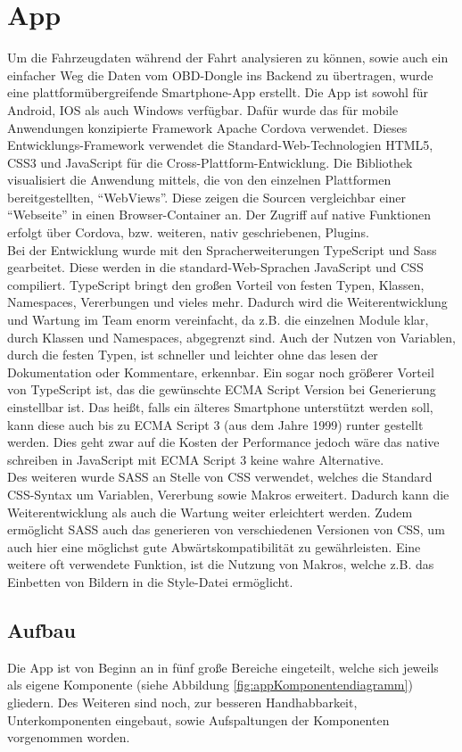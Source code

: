 \section{App}
Um die Fahrzeugdaten während der Fahrt analysieren zu können, sowie auch ein einfacher Weg die Daten vom OBD-Dongle ins Backend zu übertragen, wurde eine plattformübergreifende Smartphone-App erstellt. Die App ist sowohl für Android, IOS als auch Windows verfügbar. Dafür wurde das für mobile Anwendungen konzipierte Framework Apache Cordova verwendet. Dieses Entwicklungs-Framework verwendet die Standard-Web-Technologien HTML5, CSS3 und JavaScript für die Cross-Plattform-Entwicklung. Die Bibliothek visualisiert die Anwendung mittels, die von den einzelnen Plattformen bereitgestellten, \enquote{WebViews}. Diese zeigen die Sourcen vergleichbar einer \enquote{Webseite} in einen Browser-Container an. Der Zugriff auf native Funktionen erfolgt über Cordova, bzw. weiteren, nativ geschriebenen, Plugins.
\\
Bei der Entwicklung wurde mit den Spracherweiterungen TypeScript und Sass gearbeitet. Diese werden in die standard-Web-Sprachen JavaScript und CSS compiliert. TypeScript bringt den großen Vorteil von festen Typen, Klassen, Namespaces, Vererbungen und vieles mehr. Dadurch wird die Weiterentwicklung und Wartung im Team enorm vereinfacht, da z.B. die einzelnen Module klar, durch Klassen und Namespaces, abgegrenzt sind. Auch der Nutzen von Variablen, durch die festen Typen, ist schneller und leichter ohne das lesen der Dokumentation oder Kommentare, erkennbar. Ein sogar noch größerer Vorteil von TypeScript ist, das die gewünschte ECMA Script Version bei Generierung einstellbar ist. Das heißt, falls ein älteres Smartphone unterstützt werden soll, kann diese auch bis zu ECMA Script 3 (aus dem Jahre 1999) runter gestellt werden. Dies geht zwar auf die Kosten der Performance jedoch wäre das native schreiben in JavaScript mit ECMA Script 3 keine wahre Alternative. 
\\
Des weiteren wurde SASS an Stelle von CSS verwendet, welches die Standard CSS-Syntax um Variablen, Vererbung sowie Makros erweitert. Dadurch kann die Weiterentwicklung als auch die Wartung weiter erleichtert werden. Zudem ermöglicht SASS auch das generieren von verschiedenen Versionen von CSS, um auch hier eine möglichst gute Abwärtskompatibilität zu gewährleisten. Eine weitere oft verwendete Funktion, ist die Nutzung von Makros, welche z.B. das Einbetten von Bildern in die Style-Datei ermöglicht. 

\subsection{Aufbau}
Die App ist von Beginn an in fünf große Bereiche eingeteilt, welche sich jeweils als eigene Komponente (siehe Abbildung \ref{fig:appKomponentendiagramm}) gliedern. Des Weiteren sind noch, zur besseren Handhabbarkeit, Unterkomponenten eingebaut, sowie Aufspaltungen der Komponenten vorgenommen worden.

